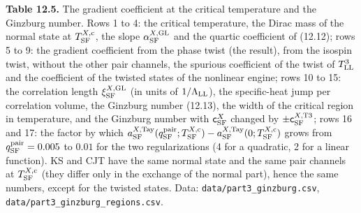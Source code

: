 \documentclass[
  10pt,
]{article}
\begin{document}
\textbf{Table 12.5.} The gradient coefficient at the critical
temperature and the Ginzburg number. Rows 1 to 4: the critical
temperature, the Dirac mass of the normal state at
\(T^{X,{\rm c}}_{\rm SF}\), the slope \(\alpha^{X,{\rm GL}}_{\rm SF}\)
and the quartic coefficient of (12.12); rows 5 to 9: the gradient
coefficient from the phase twist (the result), from the isospin twist,
without the other pair channels, the spurious coefficient of the twist
of \(T^3_{\rm LL}\) and the coefficient of the twisted states of the
nonlinear engine; rows 10 to 15: the correlation length
\(\xi^{X,{\rm GL}}_{\rm SF}\) (in units of \(1/\Lambda_{\rm LL}\)), the
specific-heat jump per correlation volume, the Ginzburg number (12.13),
the width of the critical region in temperature, and the Ginzburg number
with \(\mathsf c^X_{\rm SF}\) changed by
\(\pm\mathsf c^{X,{\rm T3}}_{\rm SF}\); rows 16 and 17: the factor by
which
\(a^{X,{\rm Tay}}_{\rm SF}(q^{\rm pair}_{\rm SF};T^{X,{\rm c}}_{\rm SF})-a^{X,{\rm Tay}}_{\rm SF}(0;T^{X,{\rm c}}_{\rm SF})\)
grows from \(q^{\rm pair}_{\rm SF}=0.005\) to \(0.01\) for the two
regularizations (4 for a quadratic, 2 for a linear function). KS and CJT
have the same normal state and the same pair channels at
\(T^{X,{\rm c}}_{\rm SF}\) (they differ only in the exchange of the
normal part), hence the same numbers, except for the twisted states.
Data: \texttt{data/part3\_ginzburg.csv},
\texttt{data/part3\_ginzburg\_regions.csv}.
\end{document}
